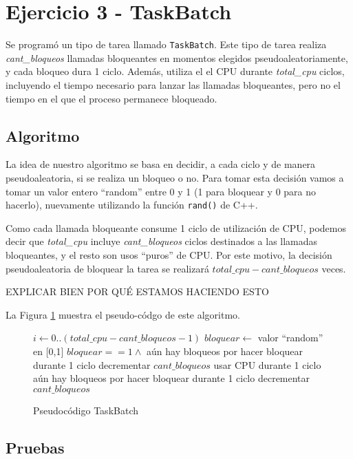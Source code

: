 \section{Ejercicio 3 - TaskBatch}

Se programó un tipo de tarea llamado {\tt TaskBatch}.  Este tipo de tarea realiza {\it cant_bloqueos} llamadas bloqueantes en momentos elegidos pseudoaleatoriamente, y cada bloqueo dura 1 ciclo.  Además, utiliza el el CPU durante {\it total_cpu} ciclos, incluyendo el tiempo necesario para lanzar las llamadas bloqueantes, pero no el tiempo en el que el proceso permanece bloqueado.

\subsection{Algoritmo}

La idea de nuestro algoritmo se basa en decidir, a cada ciclo y de manera pseudoaleatoria, si se realiza un bloqueo o no.  Para tomar esta decisión vamos a tomar un valor entero ``random'' entre 0 y 1 (1 para bloquear y 0 para no hacerlo), nuevamente utilizando la función {\tt rand()} de C++.

Como cada llamada bloqueante consume 1 ciclo de utilización de CPU, podemos decir que {\it total_cpu} incluye {\it cant_bloqueos} ciclos destinados a las llamadas bloqueantes, y el resto son usos ``puros'' de CPU.  Por este motivo, la decisión pseudoaleatoria de bloquear la tarea se realizará $total\_cpu - cant\_bloqueos$ veces. 

EXPLICAR BIEN POR QUÉ ESTAMOS HACIENDO ESTO

La Figura \ref{cod-tbatch} muestra el pseudo-códgo de este algoritmo.

\begin{figure}[!htb]
\begin{codebox}
\li \For $i \leftarrow 0 .. (total\_cpu - cant\_bloqueos - 1)$
\li \Do 	$bloquear \leftarrow $ valor ``random'' en [0,1]
\li 		\If $bloquear == 1 \wedge $ aún hay bloqueos por hacer
\li 		\Then 	bloquear durante 1 ciclo
\li	 			decrementar $cant\_bloqueos$
\li 		\Else	usar CPU durante 1 ciclo
		\End
	\End
\li \While aún hay bloqueos por hacer
\li \Do 		bloquear durante 1 ciclo
\li 			decrementar $cant\_bloqueos$
	\End
\end{codebox}
\caption{Pseudocódigo TaskBatch}\label{cod-tbatch}
\end{figure}

\subsection{Pruebas}
